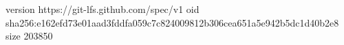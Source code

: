version https://git-lfs.github.com/spec/v1
oid sha256:e162efd73e01aad3fddfa059c7c824009812b306cea651a5e942b5dc1d40b2e8
size 203850
